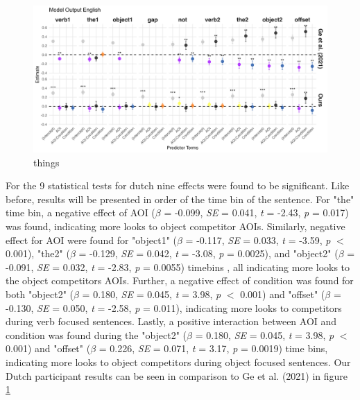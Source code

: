 \begin{figure}[H]  %
    \centering
    \includegraphics[width=\textwidth,height=\textheight,keepaspectratio]{viz/model_plot_english.png}
    \caption{things}
    \label{fig:model_plot_english}
\end{figure}

For the 9 statistical tests for dutch nine effects were found to be significant. Like before, results will be presented in order of the time bin of the sentence. For "the" time bin, a negative effect of AOI ($\beta$ = -0.099, \textit{SE} = 0.041, \textit{t} = -2.43, \textit{p} = 0.017) was found, indicating more looks to object competitor AOIs. Similarly, negative effect for AOI were found for "object1" ($\beta$ = -0.117, \textit{SE} = 0.033, \textit{t} = -3.59, \textit{p} $<$ 0.001), "the2" ($\beta$ = -0.129, \textit{SE} = 0.042, \textit{t} = -3.08, \textit{p} = 0.0025), and "object2" ($\beta$ = -0.091, \textit{SE} = 0.032, \textit{t} = -2.83, \textit{p} = 0.0055) timebins , all indicating more looks to the object competitors AOIs. Further, a negative effect of condition was found for both "object2" ($\beta$ = 0.180, \textit{SE} = 0.045, \textit{t} = 3.98, \textit{p} $<$ 0.001) and "offset" ($\beta$ = -0.130, \textit{SE} = 0.050, \textit{t} = -2.58, \textit{p} = 0.011), indicating more looks to competitors during verb focused sentences. Lastly, a positive interaction between AOI and condition was found during the "object2" ($\beta$ = 0.180, \textit{SE} = 0.045, \textit{t} = 3.98, \textit{p} $<$ 0.001) and "offset" ($\beta$ = 0.226, \textit{SE} = 0.071, \textit{t} = 3.17, \textit{p} = 0.0019)
time bins, indicating more looks to object competitors during object focused sentences. Our Dutch participant results can be seen in comparison to Ge et al. (2021) in figure \ref{fig:model_plot_english}


